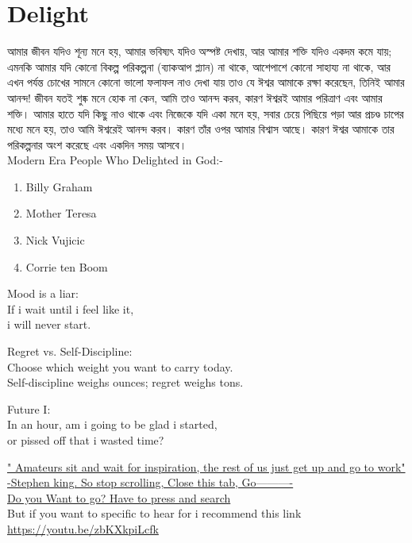 \documentclass{article}%
\begin{document}
\section{Delight}
{\bangla আমার জীবন যদিও শূন্য মনে হয়, আমার ভবিষ্যৎ যদিও অস্পষ্ট দেখায়, আর আমার শক্তি যদিও একদম কমে যায়; এমনকি আমার যদি কোনো বিকল্প পরিকল্পনা (ব্যাকআপ প্ল্যান) না থাকে, আশেপাশে কোনো সাহায্য না থাকে, আর এখন পর্যন্ত চোখের সামনে কোনো ভালো ফলাফল নাও দেখা যায় তাও যে ঈশ্বর আমাকে রক্ষা করেছেন, তিনিই আমার আনন্দ! জীবন যতই শুষ্ক মনে হোক না কেন, আমি তাও আনন্দ করব, কারণ ঈশ্বরই আমার পরিত্রাণ এবং আমার শক্তি। আমার হাতে যদি কিছু নাও থাকে এবং নিজেকে যদি একা মনে হয়, সবার চেয়ে পিছিয়ে পড়া আর প্রচণ্ড চাপের মধ্যে মনে হয়, তাও আমি ঈশ্বরেই আনন্দ করব। কারণ তাঁর ওপর আমার বিশ্বাস আছে। কারণ ঈশ্বর আমাকে তার পরিকল্পনার অংশ করেছে এবং একদিন সময় আসবে।}\\
Modern Era People Who Delighted in God:-
\begin{enumerate}[label=\Alph*.] %
    \item Billy Graham
    \item Mother Teresa
    \item Nick Vujicic
    \item Corrie ten Boom
\end{enumerate}
\begin{flushright}
    Mood is a liar:\\
    If i wait until i feel like it, \\
    i will never start.
\end{flushright}
\begin{flushleft}
    Regret vs. Self-Discipline: \\
    Choose which weight you want to carry today.\\
    Self-discipline weighs ounces; regret weighs tons.
\end{flushleft}
\begin{center}
    Future I:\\
    In an hour, am i going to be glad i started, \\
    or pissed off that i wasted time?
\end{center}
\uline{" Amateurs sit and wait for inspiration, the rest of us just get up and go to work" -Stephen king. So stop scrolling, Close this tab, Go----------}
\\\href{https://www.youtube.com/}{Do you Want to go? Have to press and search}%
\\But if you want to specific to hear for i recommend this link \\\url{https://youtu.be/zbKXkpiLcfk}
\end{document}
